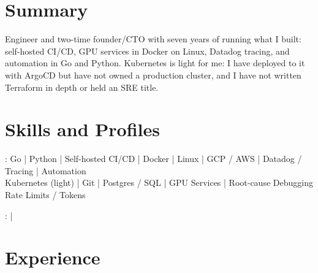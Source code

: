 \documentclass[print]{jack-resume}
\begin{document}
\pagecolor{darkmodeBackground}


\begin{minipage}[t][1cm][t]{.03\textwidth}
    \hfill
\end{minipage}

\section{Summary}
Engineer and two-time founder/CTO with seven years of running what I built: self-hosted CI/CD, GPU services in Docker on Linux, Datadog tracing, and automation in Go and Python. Kubernetes is light for me: I have deployed to it with ArgoCD but have not owned a production cluster, and I have not written Terraform in depth or held an SRE title.
\sectionsep

\section{Skills and Profiles}
:
Go \hfill | \hfill
Python \hfill | \hfill
Self-hosted CI/CD \hfill | \hfill
Docker \hfill | \hfill
Linux \hfill | \hfill
GCP / AWS \hfill | \hfill
Datadog / Tracing \hfill | \hfill
Automation \\
\hspace{1.0cm} Kubernetes (light) \hfill | \hfill
Git \hfill | \hfill
Postgres / SQL \hfill | \hfill
GPU Services \hfill | \hfill
Root-cause Debugging \\
\hspace{1.0cm} Rate Limits / Tokens \\

\raggedright{
    :
      \href{https://www.linkedin.com/in/jack-sturtevant/}{ \ExternalLink} |
     \href{https://github.com/jacksturt}{ \ExternalLink}}

\section{Experience}
\end{document}
